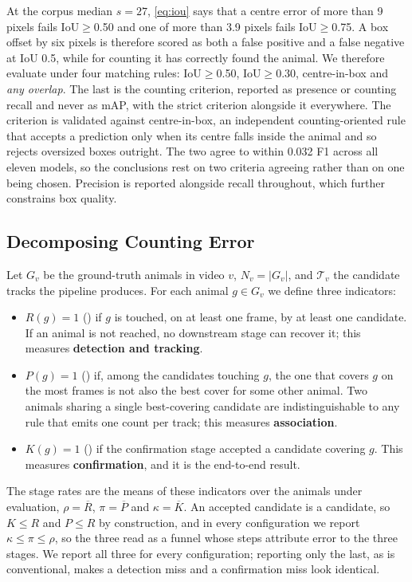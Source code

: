 At the corpus median $s=27$, \cref{eq:iou} says that a centre error of more than 9 pixels
fails IoU$\ge$0.50 and one of more than 3.9 pixels fails IoU$\ge$0.75. A box offset by six
pixels is therefore scored as both a false positive and a false negative at IoU 0.5, while
for counting it has correctly found the animal. We therefore evaluate under four matching
rules: IoU$\geq$0.50, IoU$\geq$0.30, centre-in-box and \emph{any overlap}. The last is the
counting criterion, reported as presence or counting recall and never as mAP, with the
strict criterion alongside it everywhere. The criterion is validated against
centre-in-box, an independent counting-oriented rule that accepts a prediction only when
its centre falls inside the animal and so rejects oversized boxes outright. The two agree
to within 0.032 F1 across all eleven models, so the conclusions rest on two criteria
agreeing rather than on one being chosen. Precision is reported alongside recall
throughout, which further constrains box quality.

\subsection{Decomposing Counting Error}
\label{sec:decomposition}

Let $G_v$ be the ground-truth animals in video $v$, $N_v=|G_v|$, and $\mathcal{T}_v$ the
candidate tracks the pipeline produces. For each animal $g\in G_v$ we define three
indicators:
\begin{itemize}[leftmargin=*,labelsep=4.5mm]
\item $R(g)=1$ (\reachedq) if $g$ is touched, on at least one frame, by at least one
candidate. If an animal is not reached, no downstream stage can recover it; this measures
\textbf{detection and tracking}.
\item $P(g)=1$ (\primaryq) if, among the candidates touching $g$, the one that covers $g$ on
the most frames is not also the best cover for some other animal. Two animals sharing a
single best-covering candidate are indistinguishable to any rule that emits one count per
track; this measures \textbf{association}.
\item $K(g)=1$ (\countedq) if the confirmation stage accepted a candidate covering $g$.
This measures \textbf{confirmation}, and it is the end-to-end result.
\end{itemize}
The stage rates are the means of these indicators over the animals under evaluation,
$\rho=\overline{R}$, $\pi=\overline{P}$ and $\kappa=\overline{K}$. An accepted candidate
is a candidate, so $K\le R$ and $P\le R$ by construction, and in every configuration we
report $\kappa\le\pi\le\rho$, so the three read as a funnel whose steps attribute error to
the three stages. We report all three for every configuration; reporting only the last, as
is conventional, makes a detection miss and a confirmation miss look identical.

